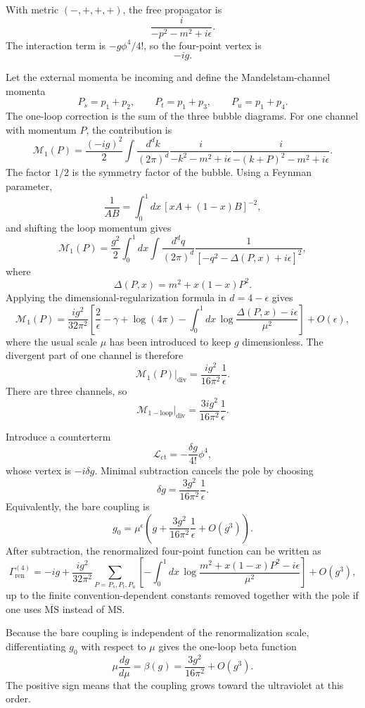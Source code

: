 \begin{solution}
With metric $(-,+,+,+)$, the free propagator is
\[
    \frac{i}{-p^2-m^2+i\epsilon}.
\]
The interaction term is $-g\phi^4/4!$, so the four-point vertex is
\[
    -ig.
\]

Let the external momenta be incoming and define the Mandelstam-channel momenta
\[
    P_s=p_1+p_2,\qquad P_t=p_1+p_3,\qquad P_u=p_1+p_4 .
\]
The one-loop correction is the sum of the three bubble diagrams. For one channel with momentum $P$, the contribution is
\[
    \mathcal M_1(P)
    =
    \frac{(-ig)^2}{2}
    \int\frac{d^dk}{(2\pi)^d}
    \frac{i}{-k^2-m^2+i\epsilon}
    \frac{i}{-(k+P)^2-m^2+i\epsilon}.
\]
The factor $1/2$ is the symmetry factor of the bubble. Using a Feynman parameter,
\[
    \frac{1}{AB}=\int_0^1dx\,[xA+(1-x)B]^{-2},
\]
and shifting the loop momentum gives
\[
    \mathcal M_1(P)
    =
    \frac{g^2}{2}
    \int_0^1dx
    \int\frac{d^dq}{(2\pi)^d}
    \frac{1}{\left[-q^2-\Delta(P,x)+i\epsilon\right]^2},
\]
where
\[
    \Delta(P,x)=m^2+x(1-x)P^2.
\]
Applying the dimensional-regularization formula in $d=4-\epsilon$ gives
\[
    \mathcal M_1(P)
    =
    \frac{ig^2}{32\pi^2}
    \left[
        \frac{2}{\epsilon}
        -\gamma+\log(4\pi)
        -\int_0^1dx\,
        \log\frac{\Delta(P,x)-i\epsilon}{\mu^2}
    \right]
    +O(\epsilon),
\]
where the usual scale $\mu$ has been introduced to keep $g$ dimensionless. The divergent part of one channel is therefore
\[
    \mathcal M_1(P)\big|_{\mathrm{div}}
    =
    \frac{ig^2}{16\pi^2}\frac{1}{\epsilon}.
\]
There are three channels, so
\[
    \mathcal M_{\mathrm{1-loop}}\big|_{\mathrm{div}}
    =
    \frac{3ig^2}{16\pi^2}\frac{1}{\epsilon}.
\]

Introduce a counterterm
\[
    \mathcal L_{\mathrm{ct}}=-\frac{\delta g}{4!}\phi^4,
\]
whose vertex is $-i\delta g$. Minimal subtraction cancels the pole by choosing
\[
    \delta g=\frac{3g^2}{16\pi^2}\frac{1}{\epsilon}.
\]
Equivalently, the bare coupling is
\[
    g_0=\mu^\epsilon\left(g+\frac{3g^2}{16\pi^2}\frac{1}{\epsilon}+O(g^3)\right).
\]
After subtraction, the renormalized four-point function can be written as
\[
    \Gamma_{\mathrm{ren}}^{(4)}
    =
    -ig
    +
    \frac{ig^2}{32\pi^2}
    \sum_{P=P_s,P_t,P_u}
    \left[
        -\int_0^1dx\,
        \log\frac{m^2+x(1-x)P^2-i\epsilon}{\mu^2}
    \right]
    +O(g^3),
\]
up to the finite convention-dependent constants removed together with the pole if one uses $\overline{\mathrm{MS}}$ instead of MS.

Because the bare coupling is independent of the renormalization scale, differentiating $g_0$ with respect to $\mu$ gives the one-loop beta function
\[
    \mu\frac{dg}{d\mu}
    =
    \beta(g)
    =
    \frac{3g^2}{16\pi^2}+O(g^3).
\]
The positive sign means that the coupling grows toward the ultraviolet at this order.
\end{solution}

